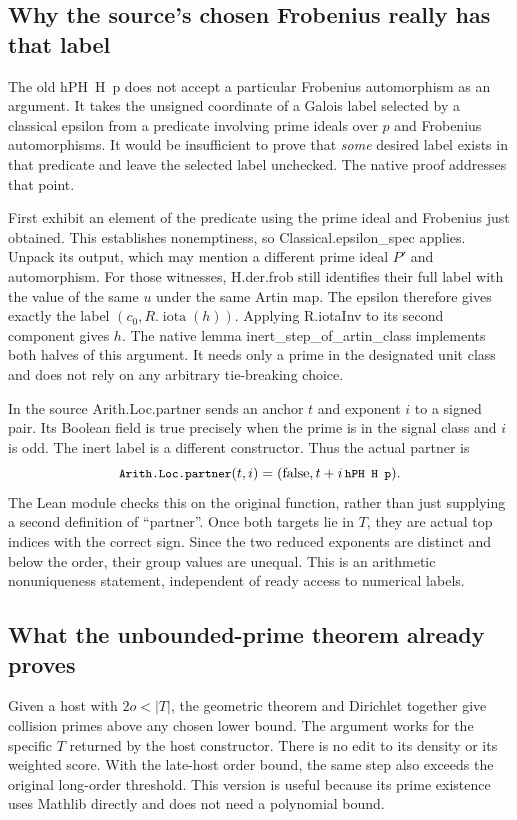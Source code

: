 \documentclass[12pt,letterpaper]{article}
\DeclareRobustCommand{\id}[1]{\mbox{\small\ttfamily #1}}
\begin{document}
\subsection{Why the source's chosen Frobenius really has that label}

The old \id{hPH H p} does not accept a particular Frobenius automorphism as an argument. It takes the unsigned coordinate of a Galois label selected by a classical epsilon from a predicate involving prime ideals over \(p\) and Frobenius automorphisms. It would be insufficient to prove that \emph{some} desired label exists in that predicate and leave the selected label unchecked. The native proof addresses that point.

First exhibit an element of the predicate using the prime ideal and Frobenius just obtained. This establishes nonemptiness, so \id{Classical.epsilon\_spec} applies. Unpack its output, which may mention a different prime ideal \(P'\) and automorphism. For those witnesses, \id{H.der.frob} still identifies their full label with the value of the same \(u\) under the same Artin map. The epsilon therefore gives exactly the label \((c_0,R.\operatorname{iota}(h))\). Applying \id{R.iotaInv} to its second component gives \(h\). The native lemma \id{inert\_step\_of\_artin\_class} implements both halves of this argument. It needs only a prime in the designated unit class and does not rely on any arbitrary tie-breaking choice.

In the source \id{Arith.Loc.partner} sends an anchor \(t\) and exponent \(i\) to a signed pair. Its Boolean field is true precisely when the prime is in the signal class and \(i\) is odd. The inert label is a different constructor. Thus the actual partner is
\[
        \id{Arith.Loc.partner}(t,i)=(\mathrm{false},t+i\,\id{hPH H p}).
\]
The Lean module checks this on the original function, rather than just supplying a second definition of “partner”. Once both targets lie in \(T\), they are actual top indices with the correct sign. Since the two reduced exponents are distinct and below the order, their group values are unequal. This is an arithmetic nonuniqueness statement, independent of ready access to numerical labels.

\subsection{What the unbounded-prime theorem already proves}

Given a host with \(2o<|T|\), the geometric theorem and Dirichlet together give collision primes above any chosen lower bound. The argument works for the specific \(T\) returned by the host constructor. There is no edit to its density or its weighted score. With the late-host order bound, the same step also exceeds the original long-order threshold. This version is useful because its prime existence uses Mathlib directly and does not need a polynomial bound.
\end{document}
